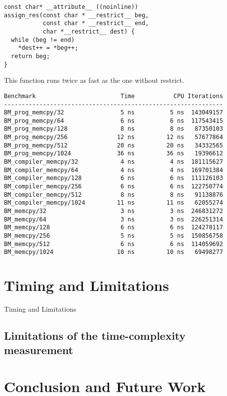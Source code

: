 \documentclass{sig-alternate}
\begin{document}
\begin{verbatim}
const char* __attribute__ ((noinline))
assign_res(const char * __restrict__ beg,
           const char * __restrict__ end,
           char *__restrict__ dest) {
  while (beg != end)
    *dest++ = *beg++;
  return beg;
}
\end{verbatim}

This function runs twice as fast as the one without restrict.

\begin{verbatim}
Benchmark                        Time           CPU Iterations
--------------------------------------------------------------
BM_prog_memcpy/32                5 ns          5 ns  143049157
BM_prog_memcpy/64                6 ns          6 ns  117543415
BM_prog_memcpy/128               8 ns          8 ns   87350103
BM_prog_memcpy/256              12 ns         12 ns   57677864
BM_prog_memcpy/512              20 ns         20 ns   34332565
BM_prog_memcpy/1024             36 ns         36 ns   19396612
BM_compiler_memcpy/32            4 ns          4 ns  181115627
BM_compiler_memcpy/64            4 ns          4 ns  169701384
BM_compiler_memcpy/128           6 ns          6 ns  111126103
BM_compiler_memcpy/256           6 ns          6 ns  122750774
BM_compiler_memcpy/512           8 ns          8 ns   91138876
BM_compiler_memcpy/1024         11 ns         11 ns   62055274
BM_memcpy/32                     3 ns          3 ns  246831272
BM_memcpy/64                     3 ns          3 ns  226251314
BM_memcpy/128                    6 ns          6 ns  124278117
BM_memcpy/256                    5 ns          5 ns  150856758
BM_memcpy/512                    6 ns          6 ns  114059692
BM_memcpy/1024                  10 ns         10 ns   69498277
\end{verbatim}


\section{Timing and Limitations}
Timing and Limitations
\subsection{Limitations of the time-complexity measurement}

\section{Conclusion and Future Work}


{\small

}
\end{document}
